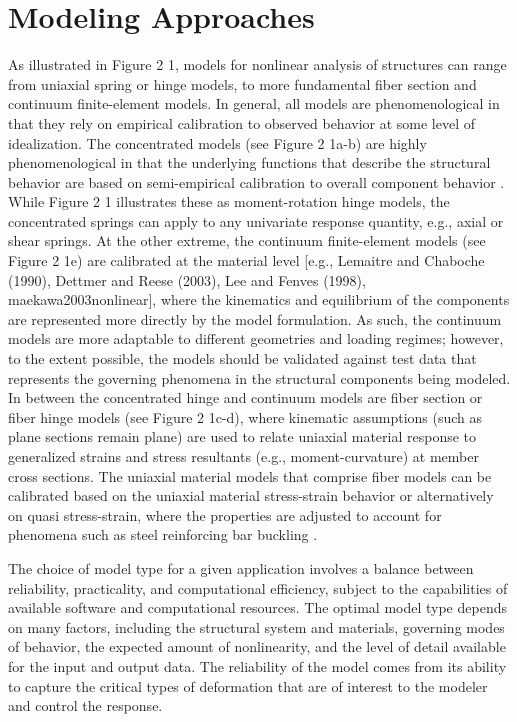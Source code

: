\section{Modeling Approaches}
\label{sec:resp_struct_methods}

As illustrated in Figure 2 1, models for nonlinear analysis of structures can range from uniaxial spring or hinge models, to more fundamental fiber section and continuum finite-element models. In general, all models are phenomenological in that they rely on empirical calibration to observed behavior at some level of idealization. The concentrated models (see Figure 2 1a-b) are highly phenomenological in that the underlying functions that describe the structural behavior are based on semi-empirical calibration to overall component behavior \cite[e.g.][]{ibarra2005hysteretic, folz2001saws, lowes2003modeling, do2018damage}. While Figure 2 1 illustrates these as moment-rotation hinge models, the concentrated springs can apply to any univariate response quantity, e.g., axial or shear springs. At the other extreme, the continuum finite-element models (see Figure 2 1e) are calibrated at the material level [e.g., Lemaitre and Chaboche (1990), Dettmer and Reese (2003), Lee and Fenves (1998), maekawa2003nonlinear], where the kinematics and equilibrium of the components are represented more directly by the model formulation. As such, the continuum models are more adaptable to different geometries and loading regimes; however, to the extent possible, the models should be validated against test data that represents the governing phenomena in the structural components being modeled. In between the concentrated hinge and continuum models are fiber section or fiber hinge models (see Figure 2 1c-d), where kinematic assumptions (such as plane sections remain plane) are used to relate uniaxial material response to generalized strains and stress resultants (e.g., moment-curvature) at member cross sections. The uniaxial material models that comprise fiber models can be calibrated based on the uniaxial material stress-strain behavior \citep[e.g.,][]{mander1988theoretical, dodd1995model, menegotto1973method} or alternatively on quasi stress-strain, where the properties are adjusted to account for phenomena such as steel reinforcing bar buckling \citep[e.g.,][]{kunnath2009nonlinear,dhakal2002pathdependent}.

The choice of model type for a given application involves a balance between reliability, practicality, and computational efficiency, subject to the capabilities of available software and computational resources. The optimal model type depends on many factors, including the structural system and materials, governing modes of behavior, the expected amount of nonlinearity, and the level of detail available for the input and output data. The reliability of the model comes from its ability to capture the critical types of deformation that are of interest to the modeler and control the response. 

